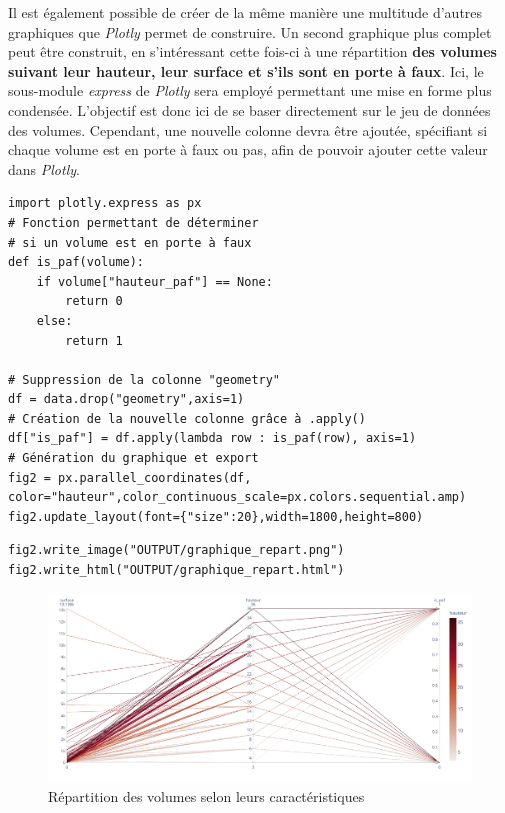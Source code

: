 \documentclass[
  11pt,
  french,
]{article}
\begin{document}
Il est également possible de créer de la même manière une multitude
d'autres graphiques que \emph{Plotly} permet de construire. Un second
graphique plus complet peut être construit, en s'intéressant cette
fois-ci à une répartition \textbf{des volumes suivant leur hauteur, leur
surface et s'ils sont en porte à faux}. Ici, le sous-module
\emph{express} de \emph{Plotly} sera employé permettant une mise en
forme plus condensée. L'objectif est donc ici de se baser directement
sur le jeu de données des volumes. Cependant, une nouvelle colonne devra
être ajoutée, spécifiant si chaque volume est en porte à faux ou pas,
afin de pouvoir ajouter cette valeur dans \emph{Plotly}.

\begin{tcolorbox}[title= Nombre de volumes par hauteur ,colback=boitecode]
\begin{lstlisting}[style=code]
import plotly.express as px
# Fonction permettant de déterminer
# si un volume est en porte à faux
def is_paf(volume):
    if volume["hauteur_paf"] == None:
        return 0
    else:
        return 1

# Suppression de la colonne "geometry"
df = data.drop("geometry",axis=1)
# Création de la nouvelle colonne grâce à .apply()
df["is_paf"] = df.apply(lambda row : is_paf(row), axis=1)
# Génération du graphique et export
fig2 = px.parallel_coordinates(df, color="hauteur",color_continuous_scale=px.colors.sequential.amp)
fig2.update_layout(font={"size":20},width=1800,height=800)\end{lstlisting}
\begin{lstlisting}[style=code]
fig2.write_image("OUTPUT/graphique_repart.png")
fig2.write_html("OUTPUT/graphique_repart.html")\end{lstlisting}
\end{tcolorbox}

\begin{tcolorbox}
\begin{figure}

{\centering \includegraphics[width=0.9\linewidth]{OUTPUT/graphique_repart} 

}

\caption[Répartition des volumes selon leurs caractéristiques  -  Réalisation personnelle]{Répartition des volumes selon leurs caractéristiques}\label{fig:graph_repart}
\end{figure}
\end{tcolorbox}
\end{document}
